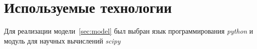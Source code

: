 \section{Используемые технологии}
Для реализации модели~\ref{sec:model} был выбран язык программирования
\emph{python} и модуль для научных вычислений \emph{scipy}
